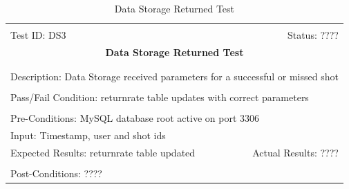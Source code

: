\documentclass[11pt]{article}
\begin{document}
\begin{center}
\begin{table}[H]
\begin{tabular}{|l r|}\hline&\\[-2mm]
	Test ID: DS3	&Status: ????\\[-3mm]
	\multicolumn{2}{|c|}{\textbf{\large{Data Storage Returned Test}}}\\&\\\hline&\\[-3mm]
	\multicolumn{2}{|p{\textwidth}|}{Description: Data Storage received parameters for a successful or missed shot}\\[1mm]\hline&\\[-3mm]
	\multicolumn{2}{|p{\textwidth}|}{Pass/Fail Condition: returnrate table updates with correct parameters}\\[1mm]\hline&\\[-3mm]
	\multicolumn{2}{|p{\textwidth}|}{Pre-Conditions: MySQL database root active on port 3306}\\[4mm]
	\multicolumn{2}{|p{\textwidth}|}{Input: Timestamp, user and shot ids}\\[2mm]\hline
	\multicolumn{1}{|p{0.49\textwidth}}{Expected Results: returnrate table updated}	&\multicolumn{1}{|p{0.45\textwidth}|}{Actual Results: ????}\\\hline&\\[-3mm]
	\multicolumn{2}{|p{\textwidth}|}{Post-Conditions: ????}\\\hline
\end{tabular}
\caption{Data Storage Returned Test}
\end{table}
\end{center}
\end{document}
